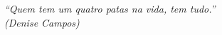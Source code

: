 \begin{epigrafe}
    \vspace*{\fill}
    \begin{flushright}
        \textit{``Quem tem um quatro patas na vida, tem tudo.''\\
        (Denise Campos)}
    \end{flushright}
\end{epigrafe}

